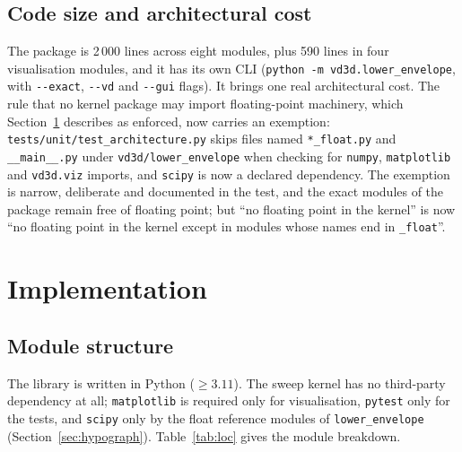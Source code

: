 \documentclass[11pt]{article}
\begin{document}
\subsection{Code size and architectural cost}

The package is 2\,000 lines across eight modules, plus 590 lines in four visualisation
modules, and it has its own CLI (\verb|python -m vd3d.lower_envelope|, with
\verb|--exact|, \verb|--vd| and \verb|--gui| flags).  It brings one real
architectural cost.  The rule that no kernel package may import floating-point
machinery, which Section~\ref{sec:implementation} describes as enforced, now
carries an exemption: \texttt{tests/unit/test\_architecture.py} skips files
named \verb|*_float.py| and \verb|__main__.py| under
\texttt{vd3d/lower\_envelope} when checking for \texttt{numpy},
\texttt{matplotlib} and \texttt{vd3d.viz} imports, and \texttt{scipy} is now a
declared dependency.  The exemption is narrow, deliberate and documented in the
test, and the exact modules of the package remain free of floating point; but
``no floating point in the kernel'' is now ``no floating point in the kernel
except in modules whose names end in \texttt{\_float}''.

\section{Implementation}
\label{sec:implementation}

\subsection{Module structure}

The library is written in Python ($\ge 3.11$).  The sweep kernel has no
third-party dependency at all; \texttt{matplotlib} is required only for
visualisation, \texttt{pytest} only for the tests, and \texttt{scipy} only by
the float reference modules of \texttt{lower\_envelope}
(Section~\ref{sec:hypograph}).  Table~\ref{tab:loc} gives the module breakdown.
\end{document}
